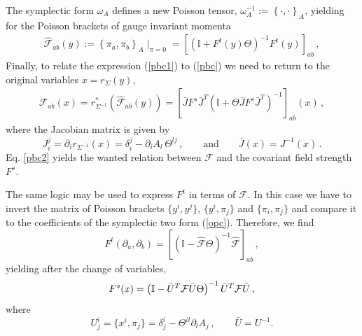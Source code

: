\documentclass[12pt,a4paper]{article}
\numberwithin{equation}{section}
\theoremstyle{definition}
\newcommand{\eqn}{\eqref}
\begin{document}
The symplectic form $\omega_A$ defines a new Poisson tensor,  $\omega^{-1}_A:=\left\lbrace \cdot , \cdot \right\rbrace_A$, yielding  for  the Poisson brackets of gauge invariant momenta 
\begin{eqnarray}\label{pbc1}
\widehat{\mathcal{F}}_{ab}(y):=\left\{\pi_a,\pi_b\right\}_A\mid_{\pi= 0}   =\left[ \left(\mathbb{I} + F^t(y) \Theta  \right)^{-1} F^t(y)\right]_{ab}\,,
\end{eqnarray}
Finally, to relate the expression (\ref{pbc1}) to (\ref{pbc}) we need to return to the original variables $x=r_{\Sigma}(y)$,
\begin{equation}\label{pbc2}
\begin{split}
\mathcal{F}_{ab}(x)=r_{\Sigma^{-1}}^*(\widehat{\mathcal{F}}_{ab}(y)) =\left[\bar J F^s\bar J^T\left(\mathbb{I}+\Theta\bar JF^s\bar J^T\right)^{-1}\right]_{ab}(x) \,,
\end{split}
\end{equation}
where the Jacobian matrix is given by
\begin{equation}
J^j_i=\partial_i r_{\Sigma^{-1}}(x)=\delta^j_i-\partial_iA_l\,\Theta^{lj}\,,\qquad\mbox{and}\qquad \bar J(x)=J^{-1}(x)\,.
\end{equation}
Eq. \eqn{pbc2} yields the wanted relation between $\mathcal{F}$ and the covariant field strength $F^s$.

The same logic may be used to express $F^t$ in terms of $\mathcal{F}$. In this case we have to invert the matrix of Poisson brackets $\{y^i,y^j\}$, $\{y^i,\pi_j\}$ and $\{\pi_i,\pi_j\}$ and compare it to the coefficients of the symplectic two form (\ref{opc}). Therefore, we find
\begin{equation}
F^t(\partial_a,\partial_b)=\left[ \left(\mathbb{I} - \widehat{\mathcal{F}} \Theta  \right)^{-1} \widehat{\mathcal{F}} \right]_{ab}\,,
\end{equation}
yielding after the change of variables,
\begin{equation}
F^s(x)=\left(\mathbb{I}-\bar U^T{\cal F}\bar U\Theta\right)^{-1}\bar U^T{\cal F}\bar U\,,
\end{equation}
where
\begin{equation}
U^i_j=\{x^i,\pi_j\}=\delta^i_j-\Theta^{il}\partial_lA_j\,,\qquad \bar U=U^{-1}.
\end{equation}

\end{document}
